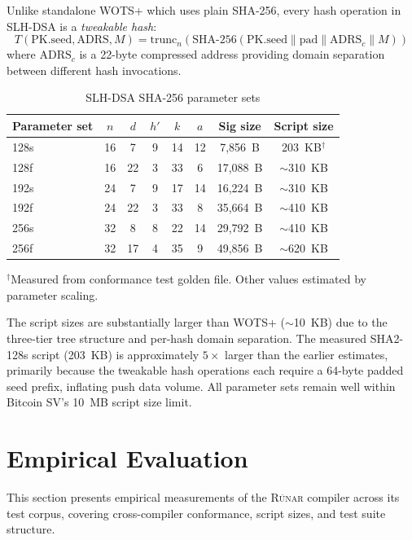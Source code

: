 \documentclass[11pt,a4paper]{article}
\newcommand{\runar}{\textsc{Rúnar}}
\begin{document}
Unlike standalone WOTS+ which uses plain SHA-256, every hash operation in
SLH-DSA is a \emph{tweakable hash}:
\[
  T(\text{PK.seed}, \text{ADRS}, M) =
  \text{trunc}_n\!\left(\text{SHA-256}(\text{PK.seed} \| \text{pad} \| \text{ADRS}_c \| M)\right)
\]
where $\text{ADRS}_c$ is a 22-byte compressed address providing domain
separation between different hash invocations.

\begin{table}[h]
\centering
\caption{SLH-DSA SHA-256 parameter sets}
\label{tab:slhdsa}
\begin{tabular}{@{}lccccccc@{}}
\toprule
Parameter set & $n$ & $d$ & $h'$ & $k$ & $a$ & Sig size & Script size \\
\midrule
128s & 16 & 7 & 9 & 14 & 12 & 7,856~B & 203~KB$^\dagger$ \\
128f & 16 & 22 & 3 & 33 & 6 & 17,088~B & $\sim$310~KB \\
192s & 24 & 7 & 9 & 17 & 14 & 16,224~B & $\sim$310~KB \\
192f & 24 & 22 & 3 & 33 & 8 & 35,664~B & $\sim$410~KB \\
256s & 32 & 8 & 8 & 22 & 14 & 29,792~B & $\sim$410~KB \\
256f & 32 & 17 & 4 & 35 & 9 & 49,856~B & $\sim$620~KB \\
\bottomrule
\end{tabular}
\vspace{0.3em}
\footnotesize{$^\dagger$Measured from conformance test golden file.
  Other values estimated by parameter scaling.}
\end{table}

The script sizes are substantially larger than WOTS+ ($\sim$10~KB)
due to the three-tier tree structure and per-hash domain separation.
The measured SHA2-128s script (203~KB) is approximately $5\times$ larger
than the earlier estimates, primarily because the tweakable hash
operations each require a 64-byte padded seed prefix, inflating push
data volume. All parameter sets remain well within Bitcoin SV's 10~MB
script size limit.

\section{Empirical Evaluation}
\label{sec:evaluation}

This section presents empirical measurements of the \runar{} compiler across
its test corpus, covering cross-compiler conformance, script sizes, and
test suite structure.
\end{document}
